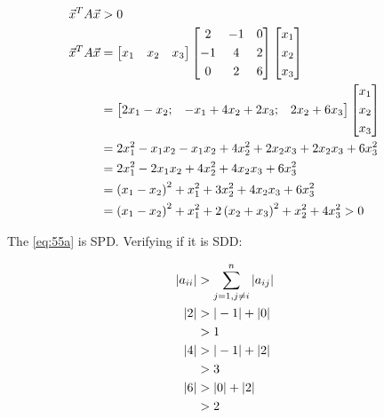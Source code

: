 		\begin{align}
			\vec{x}^{T}A\vec{x} &> 0& \notag \\
			\vec{x}^{T}A\vec{x} &= \begin{bmatrix}
				x_{1} & x_{2} & x_{3}
				\end{bmatrix}
				\begin{bmatrix}
					2 & -1 & 0 \\[0.3em]
					-1 & 4 & 2 \\[0.3em]
					0 & 2 & 6
				\end{bmatrix}
				\begin{bmatrix}
					x_{1} \\[0.3em]
					x_{2} \\[0.3em]
					x_{3}
				\end{bmatrix}& \\
			&= \begin{bmatrix}
					2x_{1} - x_{2} ; & -x_{1} + 4x_{2} + 2x_{3} ; & 2x_{2} + 6x_{3}
				\end{bmatrix}
				\begin{bmatrix}
					x_{1} \\[0.3em]
					x_{2} \\[0.3em]
					x_{3}
				\end{bmatrix}& \notag \\
			& = 2x_{1}^{2} - x_{1}x_{2} - x_{1}x_{2} + 4x_{2}^{2} + 2x_{2}x_{3} + 2x_{2}x_{3} + 6x_{3}^{2}& \notag \\
			& = 2x_{1}^{2} - 2x_{1}x_{2} + 4x_{2}^{2} + 4x_{2}x_{3} + 6x_{3}^{2}& \notag \\
			& = \left(x_{1} - x_{2}\right)^{2} + x_{1}^{2} + 3x_{2}^{2} + 4x_{2}x_{3} + 6x_{3}^{2}& \notag \\
			& = \left(x_{1} - x_{2}\right)^{2} + x_{1}^{2} + 2\left(x_{2} + x_{3}\right)^{2} + x_{2}^{2} + 4x_{3}^{2} > 0&
		\label{eq:55axtax}
		\end{align}

		The \cref{eq:55a} is SPD. Verifying if it is SDD:

		\begin{align}
			\left|a_{ii}\right| &> \sum_{j=1,j \neq i}^{n} \left|a_{ij}\right|& \\
			|2| &> |-1| + |0|& \notag \\
			&> 1 & \\
			|4| &> |-1| + |2|& \notag \\
			&> 3 & \\
			|6| &> |0| + |2|& \notag \\
			&> 2&
 		\label{eq:55asdd}
		\end{align}

